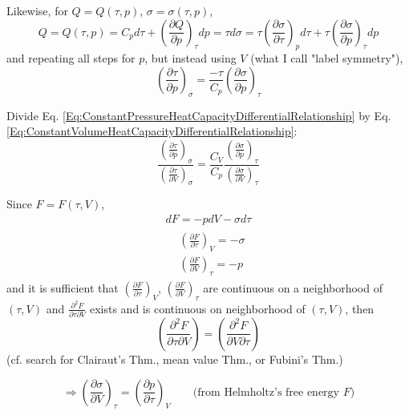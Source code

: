 Likewise, for $Q= Q(\tau, p)$, $\sigma = \sigma(\tau, p)$, 
\[
Q = Q(\tau, p) = C_p d\tau + \left( \frac{\partial Q}{\partial p } \right)_{\tau} dp = \tau d\sigma = \tau \left( \frac{\partial \sigma}{\partial \tau} \right)_p d\tau + \tau \left( \frac{\partial \sigma}{ \partial p} \right)_{\tau} dp
\]
and repeating all steps for $p$, but instead using $V$ (what I call "label symmetry"), 
\begin{equation}\label{Eq:ConstantPressureHeatCapacityDifferentialRelationship}
\left( \frac{\partial \tau}{\partial p } \right)_{\sigma} = \frac{-\tau}{C_p} \left( \frac{\partial \sigma}{\partial p} \right)_{\tau}
\end{equation}

Divide Eq. \ref{Eq:ConstantPressureHeatCapacityDifferentialRelationship} by Eq. \ref{Eq:ConstantVolumeHeatCapacityDifferentialRelationship}:
\begin{equation}\label{Eq:ConstantPressureHeatCapacityRelationshipOverConstantVolume}
\frac{ \left( \frac{\partial \tau}{\partial p}\right)_{\sigma} }{ \left( \frac{\partial \tau}{\partial V}\right)_{\sigma} } = \frac{C_V}{C_p} \frac{ \left( \frac{\partial \sigma}{\partial p}\right)_{\tau} }{ \left( \frac{\partial \sigma}{\partial V}\right)_{\tau} }
\end{equation} 

Since $F= F(\tau, V)$, 
\[
\begin{gathered}
dF = -pdV - \sigma d\tau \\
\begin{aligned}
& \left(\frac{\partial F}{\partial \tau} \right)_V = -\sigma \\ 
& \left(\frac{\partial F}{\partial V} \right)_{\tau} = - p 
\end{aligned}
\end{gathered}
\]
and it is sufficient that $\left(\frac{\partial F}{\partial \tau} \right)_V$, $\left(\frac{\partial F}{\partial V} \right)_{\tau}$ are continuous on a neighborhood of $(\tau, V)$ and $\frac{\partial^2 F}{ \partial \tau \partial V}$ exists and is continuous on neighborhood of $(\tau, V)$, then
\[
\left(\frac{\partial^2 F}{\partial \tau \partial V} \right) = \left(\frac{\partial^2 F}{\partial V \partial \tau} \right)
\]
(cf. search for Clairaut's Thm., mean value Thm., or Fubini's Thm.)

\begin{equation}\label{Eq:2ndOrderPartialDerivativeHelmholtzRelationship}
\Longrightarrow \left( \frac{ \partial \sigma}{ \partial V} \right)_{\tau} = \left(\frac{\partial p}{\partial \tau } \right)_V \qquad \text{(from Helmholtz's free energy $F$)}
\end{equation}

